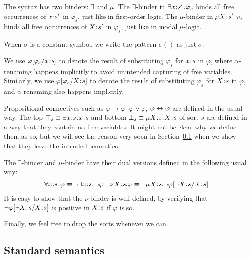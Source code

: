 \documentclass{amsart}
\begin{document}
The syntax has two binders: $\exists$ and $\mu$.
The $\exists$-binder in $\exists x \mathbin{\!:\!} s' \mathbin{\!.\!} \varphi_s$
binds all free occurrences of $x \mathbin{\!:\!} s'$ in $\varphi_s$,
just like in first-order logic.
The $\mu$-binder in $\mu X \mathbin{\!:\!} s' \mathbin{\!.\!} \varphi_s$
binds all free occurrences of $X \mathbin{\!:\!} s'$ in $\varphi_s$,
just like in modal $\mu$-logic.

When $\sigma$ is a constant symbol, 
we write the pattern $\sigma()$ as just $\sigma$.

We use $\varphi[\varphi_s / x \mathbin{\!:\!} s]$ to denote
the result of substituting $\varphi_s$ for $x \mathbin{\!:\!} s$
in $\varphi$, where $\alpha$-renaming happens implicitly to avoid
unintended capturing of free variables. 
Similarly, we use $\varphi[\varphi_s / X \mathbin{\!:\!} s]$ to denote
the result of substituting $\varphi_s$ for $X \mathbin{\!:\!} s$
in $\varphi$, and $\alpha$-renaming also happens implicitly.

Propositional connectives
such as $\varphi \to \varphi$, $\varphi \vee \varphi$,
$\varphi \leftrightarrow \varphi$
are defined in the usual way.
The top $\top_s \equiv \exists x \mathbin{\!:\!} s \mathbin{\!.\!} x \mathbin{\!:\!} s$ 
and bottom $\bot_s \equiv \mu X \mathbin{\!:\!} s \mathbin{\!.\!} X \mathbin{\!:\!} s$ of sort $s$
are defined in a way that they contain no free variables.  
It might not be clear why we define them as so,
but we will see the reason very soon in Section~\ref{sec:standard_semantics}
when we show that they have the intended semantics.

The $\exists$-binder and $\mu$-binder have their
dual versions defined in the following usual way:
\begin{align*}
\forall x \cln s \ldot \varphi \equiv \neg \exists x \cln s \ldot \neg \varphi
&&
\nu X \cln s . \varphi \equiv \neg \mu X \cln s . \neg \varphi[\neg X \cln s / 
X \cln s]
\end{align*}
It is easy to show that the $\nu$-binder
is well-defined, by verifying that $\neg \varphi[\neg X \mathbin{\!:\!} s / X \mathbin{\!:\!} s]$ is 
positive in
$X \mathbin{\!:\!} s$ if $\varphi$ is so.

Finally, we feel free to drop the sorts whenever we can.


\subsection{Standard semantics}
\label{sec:standard_semantics}
\end{document}
